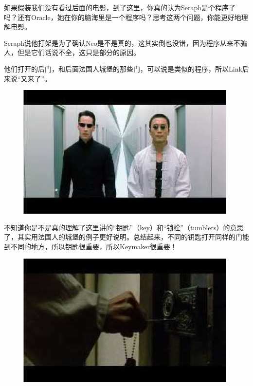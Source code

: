 \documentclass[UTF8]{ctexart}
\begin{document}
如果假装我们没有看过后面的电影，到了这里，你真的认为Seraph是个程序了吗？还有Oracle，她在你的脑海里是一个程序吗？思考这两个问题，你能更好地理解电影。

Seraph说他打架是为了确认Neo是不是真的，这其实倒也没错，因为程序从来不骗人，但是它们话说不全，这只是部分的原因。

他们打开的后门，和后面法国人城堡的那些门，可以说是类似的程序，所以Link后来说“又来了”。

\begin{figure}[htb]
\centering
\includegraphics[width=0.5\linewidth]{fig/read_reloaded-61}
\end{figure}

不知道你是不是真的理解了这里讲的“钥匙”（key）和“锁栓”（tumblers）的意思了，其实用法国人的城堡的例子更好说明。总结起来，不同的钥匙打开同样的门能到不同的地方，所以钥匙很重要，所以Keymaker很重要！

\begin{figure}[htb]
\centering
\includegraphics[width=0.5\linewidth]{fig/read_reloaded-62}
\end{figure}
\end{document}
